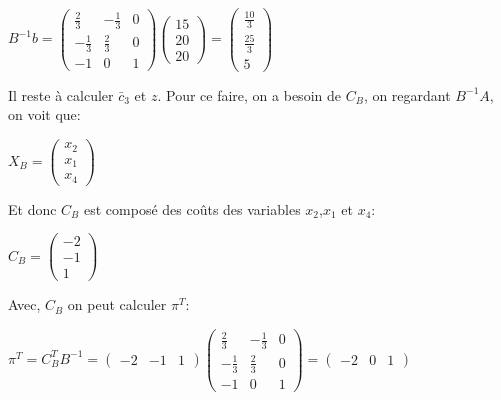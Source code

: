 \begin{center}
	\begin{math}
	B^{-1}b =
	\begin{pmatrix}
		\frac{2}{3}  & -\frac{1}{3} & 0 \\[5pt]
		-\frac{1}{3} & \frac{2}{3}  & 0 \\[5pt]
		-1           & 0            & 1
	\end{pmatrix}
	\begin{pmatrix}
		15 \\[5pt]
		20 \\[5pt]
		20
	\end{pmatrix}
	=
	\begin{pmatrix}
		\frac{10}{3} \\[5pt]
		\frac{25}{3} \\[5pt]
		5
	\end{pmatrix}
	\end{math}
\end{center}
	
Il reste à calculer $\bar{c}_3$ et $z$. Pour ce faire, on a besoin de $C_B$, on regardant $B^{-1}A$, on voit que:

\begin{center}
	\begin{math} 
	X_B =
	\begin{pmatrix}
		x_2 \\
		x_1 \\
		x_4
	\end{pmatrix}
	\end{math}
\end{center}

Et donc $C_B$ est composé des coûts des variables $x_2$,$x_1$ et $x_4$:
\begin{center}
	\begin{math}
	C_B = 
	\begin{pmatrix}
		-2 \\
		-1 \\
		1
	\end{pmatrix}
	\end{math}
\end{center}

Avec, $C_B$ on peut calculer $\pi^{T}$:
	
\begin{center}
	\begin{math}
	\pi^{T} = C_B^TB^{-1} =
	\begin{pmatrix}
		-2 & -1 & 1
	\end{pmatrix}
	\begin{pmatrix}
		\frac{2}{3}  & -\frac{1}{3} & 0 \\[5pt]
		-\frac{1}{3} & \frac{2}{3}  & 0 \\[5pt]
		-1           & 0            & 1
	\end{pmatrix}
	=
	\begin{pmatrix}
		-2 & 0 & 1
	\end{pmatrix}
	\end{math}
\end{center}

